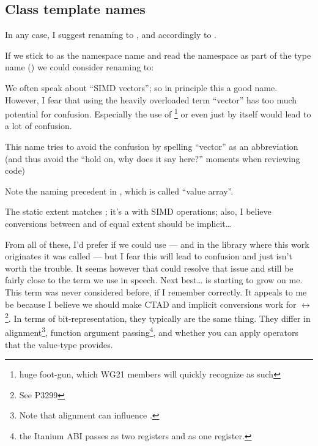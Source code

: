 \subsection{Class template names}
In any case, I suggest renaming \mask to , and accordingly
 to .

If we stick to \std{} as the namespace name and read the namespace as
part of the type name () we could consider renaming
 to:
\begin{list}{}{
  \setlength{\topsep}{0pt}%
  \setlength{\leftmargin}{7em}%
  \setlength{\rightmargin}{0pt}%
  \setlength{\labelwidth}{7em}%
}

  \item[\code{simd::vector}]
    We often speak about “SIMD vectors”; so in principle this a good name.
    However, I fear that using the heavily overloaded term “vector” has too
    much potential for confusion.
    Especially the use of \footnote{huge foot-gun, which WG21 members will quickly
    recognize as such} or even just  by
    itself would lead to a lot of confusion.

  \item[\code{simd::vec}]
    This name tries to avoid the confusion by spelling “vector” as an
    abbreviation (and thus avoid the “hold on, why does it say 
    here?” moments when reviewing code)

  \item[\code{simd::value}]
    Note the naming precedent in , which is called “value
    array”.

  \item[\code{simd::values}]

  \item[\code{simd::array}]
    The static extent matches \std{}; it's a \std{} with
    SIMD operations; also, I believe conversions between  and
    \std{} of equal extent should be implicit\ldots
\end{list}

From all of these, I'd prefer if we could use  --- and
in the library where this work originates it was called 
--- but I fear this will lead to confusion and just isn't worth the trouble.
It seems however that  could resolve that issue and still
be fairly close to the term we use in speech.
Next best\ldots{}  is starting to grow on me.
This term was never considered before, if I remember correctly.
It appeals to me be because I believe we should make CTAD and implicit
conversions work for  $\leftrightarrow$ \footnote{See P3299}.
In terms of bit-representation, they typically are the same thing.
They differ in alignment\footnote{Note that alignment can influence
.}, function argument passing\footnote{\Eg the Itanium ABI passes
   as two  registers and 
as one  register.}, and whether you can apply operators that the
value-type provides.

